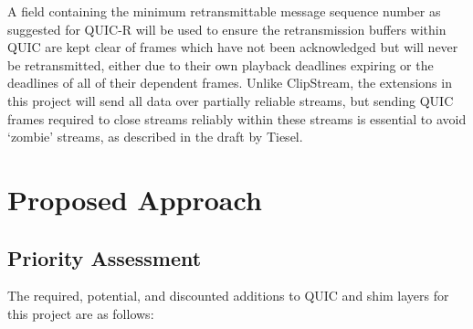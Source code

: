 \documentclass{mprop}
\begin{document}
A field containing the minimum retransmittable message sequence number as suggested for QUIC-R will be used to ensure the retransmission buffers within QUIC are kept clear of frames which have not been acknowledged but will never be retransmitted, either due to their own playback deadlines expiring or the deadlines of all of their dependent frames. Unlike ClipStream, the extensions in this project will send all data over partially reliable streams, but sending QUIC frames required to close streams reliably within these streams is essential to avoid `zombie' streams, as described in the draft by Tiesel.

\newpage

\section{Proposed Approach}


\subsection{Priority Assessment}

The required, potential, and discounted additions to QUIC and shim layers for this project are as follows:
\end{document}
